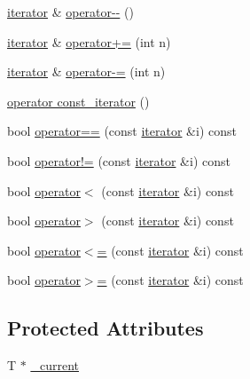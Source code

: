 \begin{DoxyCompactItemize}
\hyperlink{classVector_1_1iterator}{iterator} \& \hyperlink{classVector_1_1iterator_ac2a3f19d49c56b74100ac758cc5fc2aa_ac2a3f19d49c56b74100ac758cc5fc2aa}{operator-\/-\/} ()
\item 
\hyperlink{classVector_1_1iterator}{iterator} \& \hyperlink{classVector_1_1iterator_a5bf29b945b7717ff57ac278f7de6c158_a5bf29b945b7717ff57ac278f7de6c158}{operator+=} (int n)
\item 
\hyperlink{classVector_1_1iterator}{iterator} \& \hyperlink{classVector_1_1iterator_a51446f7c5ebf3c37db5f2855217836b6_a51446f7c5ebf3c37db5f2855217836b6}{operator-\/=} (int n)
\item 
\hyperlink{classVector_1_1iterator_a19a200b30d6acf43210a44620462e5e8_a19a200b30d6acf43210a44620462e5e8}{operator const\+\_\+iterator} ()
\item 
bool \hyperlink{classVector_1_1iterator_a105d376582ed6fdbf2e645f95a3b26df_a105d376582ed6fdbf2e645f95a3b26df}{operator==} (const \hyperlink{classVector_1_1iterator}{iterator} \&i) const
\item 
bool \hyperlink{classVector_1_1iterator_a755741485c5a92ed32484b350abfd041_a755741485c5a92ed32484b350abfd041}{operator!=} (const \hyperlink{classVector_1_1iterator}{iterator} \&i) const
\item 
bool \hyperlink{classVector_1_1iterator_a2168ad507f6877bd555bb00094eae2a7_a2168ad507f6877bd555bb00094eae2a7}{operator$<$} (const \hyperlink{classVector_1_1iterator}{iterator} \&i) const
\item 
bool \hyperlink{classVector_1_1iterator_a1136d388a7615e1b924ae5e30db1e420_a1136d388a7615e1b924ae5e30db1e420}{operator$>$} (const \hyperlink{classVector_1_1iterator}{iterator} \&i) const
\item 
bool \hyperlink{classVector_1_1iterator_af74c57313919fde4c919027969233977_af74c57313919fde4c919027969233977}{operator$<$=} (const \hyperlink{classVector_1_1iterator}{iterator} \&i) const
\item 
bool \hyperlink{classVector_1_1iterator_ae7d6040f2120fcb90582dafe924e837b_ae7d6040f2120fcb90582dafe924e837b}{operator$>$=} (const \hyperlink{classVector_1_1iterator}{iterator} \&i) const
\end{DoxyCompactItemize}
\subsection*{Protected Attributes}
\begin{DoxyCompactItemize}
\item 
T $\ast$ \hyperlink{classVector_1_1iterator_a4631750ea2c5b6a421b0d0eedbe4627c_a4631750ea2c5b6a421b0d0eedbe4627c}{\+\_\+current}
\end{DoxyCompactItemize}


